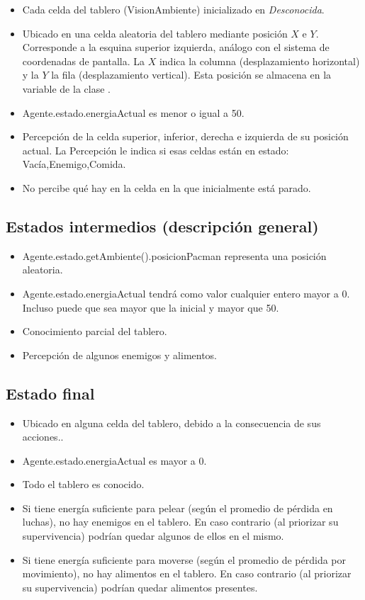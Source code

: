 \begin{itemize}
\item Cada celda del tablero (VisionAmbiente) inicializado en
\emph{Desconocida}.
\item Ubicado en una celda aleatoria del tablero mediante posición $X$ e $Y$.
Corresponde a la esquina superior izquierda, análogo con el sistema de
coordenadas de pantalla. La $X$ indica la columna (desplazamiento horizontal) y
la $Y$ la fila (desplazamiento vertical). Esta posición se almacena en la
variable  de la clase .
\item Agente.estado.energiaActual es menor o igual a 50.
\item Percepción de la celda superior, inferior, derecha e izquierda de su
posición actual. La Percepción le indica si esas celdas están en estado:
Vacía,Enemigo,Comida.
\item No percibe qué hay en la celda en la que inicialmente está parado.
\end{itemize}

\subsection{Estados intermedios (descripción general)}

\begin{itemize}
\item Agente.estado.getAmbiente().posicionPacman representa una posición
aleatoria.
\item Agente.estado.energiaActual tendrá como valor cualquier entero mayor a 0.
Incluso puede que sea mayor que la inicial y mayor que 50.
\item Conocimiento parcial del tablero.
\item Percepción de algunos enemigos y alimentos.
\end{itemize}

\subsection{Estado final}

\begin{itemize}
\item Ubicado en alguna celda del tablero, debido a la consecuencia de sus acciones..
\item Agente.estado.energiaActual es mayor a 0.
\item Todo el tablero es conocido.
\item Si tiene energía suficiente para pelear (según el promedio de pérdida en
luchas), no hay enemigos en el tablero. En caso contrario (al priorizar su
supervivencia) podrían quedar algunos de ellos en el mismo.
\item Si tiene energía suficiente para moverse (según el promedio de pérdida
por movimiento), no hay alimentos en el tablero. En caso contrario (al
priorizar su supervivencia) podrían quedar alimentos presentes.
\end{itemize}
